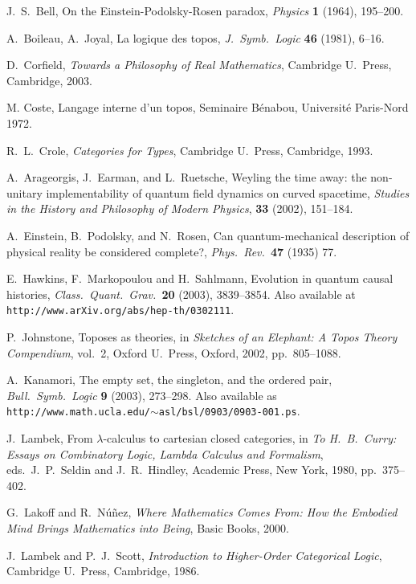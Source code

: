 \documentclass[12pt]{article}
\begin{document}
\begin{thebibliography}{99}
 J.\ S.\ Bell, On the Einstein-Podolsky-Rosen 
paradox, {\sl Physics} {\bf 1} (1964), 195--200.

 A.\ Boileau, A.\ Joyal, La logique des topos,
{\sl J.\ Symb.\ Logic} {\bf 46} (1981), 6--16.

 D.\ Corfield, {\sl Towards a Philosophy of
Real Mathematics}, Cambridge U.\ Press, Cambridge, 2003.

 M. Coste, Langage interne d'un topos, 
Seminaire B\'enabou, Universit\'e Paris-Nord 1972.

 R.\ L.\ Crole, {\sl Categories for Types}, Cambridge
U.\ Press, Cambridge, 1993.

A.\ Arageorgis, J.\ Earman, and L.\ Ruetsche, 
Weyling the time away: the non-unitary implementability of 
quantum field dynamics on curved spacetime, 
{\sl Studies in the History and Philosophy of Modern Physics}, 
{\bf 33} (2002), 151--184. 

 A.\ Einstein, B.\ Podolsky, and N.\ Rosen, 
Can quantum-mechanical description of physical reality
be considered complete?,  {\sl Phys.\ Rev.\ }{\bf 47} (1935) 77.

 E.\ Hawkins, F.\ Markopoulou and H.\ Sahlmann,
Evolution in quantum causal histories, {\sl Class.\ Quant.\ 
Grav.\ }{\bf 20} (2003), 3839--3854.  Also available at \hfill \break
\texttt{http://www.arXiv.org/abs/hep-th/0302111}.

 P.\ Johnstone, Toposes as theories, in 
{\sl Sketches of an Elephant: A Topos Theory Compendium}, 
vol.\ 2, Oxford U.\ Press, Oxford, 2002, pp.\ 805--1088.

 A.\ Kanamori, The empty set, the singleton,
and the ordered pair, {\sl Bull.\ Symb.\ Logic} {\bf 9} (2003),
273--298.  Also available as
\texttt{http://www.math.ucla.edu/$\sim$asl/bsl/0903/0903-001.ps}. 

 J.\ Lambek, From $\lambda$-calculus to cartesian
closed categories, in {\sl To H.\ B.\ Curry: Essays on Combinatory
Logic, Lambda Calculus and Formalism}, eds.\ J.\ P.\ Seldin and J.\
R.\ Hindley, Academic Press, New York, 1980, pp.\ 375--402. 

G.\ Lakoff and R.\ N\'u\~nez, {\sl Where Mathematics Comes From: 
How the Embodied Mind Brings Mathematics into Being}, Basic Books, 2000. 

\bibitem{LS} J.\ Lambek and P.\ J.\ Scott, {\sl Introduction to
Higher-Order Categorical Logic}, Cambridge U.\ Press, Cambridge,
1986.  


\end{thebibliography}
\end{document}
